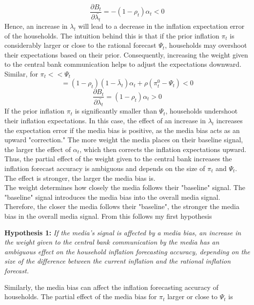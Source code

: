 \documentclass[review]{elsarticle}
\begin{document}
\begin{equation}
\frac{\partial B_t}{\partial \bar{\lambda_t}} = -(1-\rho_t)\alpha_t < 0
\end{equation}
Hence, an increase in $\lambda_t$ will lead to a decrease in the inflation expectation error of the households. The intuition behind this is that if the prior inflation $\pi_t$ is considerably larger or close to the rational forecast $\Psi_t$, households may overshoot their expectations based on their prior. Consequently, increasing the weight given to the central bank communication helps to adjust the expectations downward.
\\
Similar, for $\pi_t <<\Psi_t$
\begin{equation}
= (1-\rho_t)(1-\bar{\lambda}_t)\alpha_t + \rho(\pi_t^0 - \Psi_t) < 0
\end{equation}
\begin{equation}
\frac{\partial B_t}{\partial \bar{\lambda_t}} = (1-\rho_t)\alpha_t > 0
\end{equation}
If the prior inflation $\pi_t$ is significantly smaller than $\Psi_t$, households undershoot their inflation expectations. In this case, the effect of an increase in $\lambda_t$ increases the expectation error if the media bias is positive, as the media bias acts as an upward "correction." The more weight the media places on their baseline signal, the larger the effect of $\alpha_t$, which then corrects the inflation expectations upward.
\\ 
Thus, the partial effect of the weight given to the central bank increases the inflation forecast accuracy is ambiguous and depends on the size of $\pi_t$ and $\Psi_t$. The effect is stronger, the larger the media bias is. 
\\
The weight determines how closely the media follows their "baseline" signal. The "baseline" signal introduces the media bias into the overall media signal. Therefore, the closer the media follows their "baseline", the stronger the media bias in the overall media signal. 
From this follows my first hypothesis
\par
\textbf{Hypothesis 1:} \textit{If the media's signal is affected by a media bias, an increase in the weight given to the central bank communication by the media has an ambiguous effect on the household inflation forecasting accuracy, depending on the size of the difference between the current inflation and the rational inflation forecast.} 
\par
Similarly, the media bias can affect the inflation forecasting accuracy of households. The partial effect of the media bias for $\pi_t$ larger or close to $\Psi_t$ is
\end{document}
